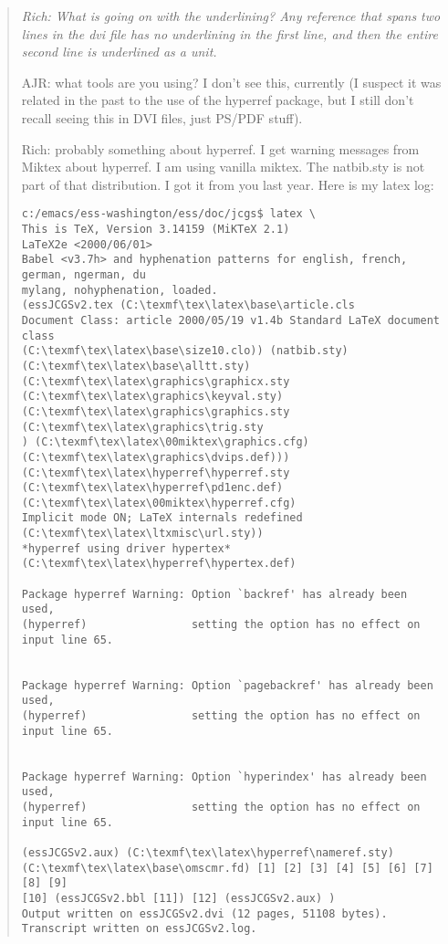 \documentclass{article}
\def\url#1{\textsf{#1}} %
\newenvironment{Comment}{\begin{quote}\small\itshape }{\end{quote}}
\begin{document}
\begin{Comment}
  Rich: What is going on with the underlining?  Any reference that spans
two lines in the dvi file has no underlining in the first line, and then the
entire second line is underlined as a unit.

AJR: what tools are you using?  I don't see this, currently (I suspect
it was related in the past to the use of the hyperref package, but I
still don't recall seeing this in DVI files, just PS/PDF stuff).

Rich: probably something about hyperref.  I get warning messages from
Miktex about hyperref.  I am using vanilla miktex.  The natbib.sty is
not part of that distribution.  I got it from you last year.  Here is
my latex log:
\begin{verbatim}
c:/emacs/ess-washington/ess/doc/jcgs$ latex \
This is TeX, Version 3.14159 (MiKTeX 2.1)
LaTeX2e <2000/06/01>
Babel <v3.7h> and hyphenation patterns for english, french, german, ngerman, du
mylang, nohyphenation, loaded.
(essJCGSv2.tex (C:\texmf\tex\latex\base\article.cls
Document Class: article 2000/05/19 v1.4b Standard LaTeX document class
(C:\texmf\tex\latex\base\size10.clo)) (natbib.sty)
(C:\texmf\tex\latex\base\alltt.sty) (C:\texmf\tex\latex\graphics\graphicx.sty
(C:\texmf\tex\latex\graphics\keyval.sty)
(C:\texmf\tex\latex\graphics\graphics.sty (C:\texmf\tex\latex\graphics\trig.sty
) (C:\texmf\tex\latex\00miktex\graphics.cfg)
(C:\texmf\tex\latex\graphics\dvips.def)))
(C:\texmf\tex\latex\hyperref\hyperref.sty
(C:\texmf\tex\latex\hyperref\pd1enc.def)
(C:\texmf\tex\latex\00miktex\hyperref.cfg)
Implicit mode ON; LaTeX internals redefined
(C:\texmf\tex\latex\ltxmisc\url.sty))
*hyperref using driver hypertex*
(C:\texmf\tex\latex\hyperref\hypertex.def)

Package hyperref Warning: Option `backref' has already been used,
(hyperref)                setting the option has no effect on input line 65.


Package hyperref Warning: Option `pagebackref' has already been used,
(hyperref)                setting the option has no effect on input line 65.


Package hyperref Warning: Option `hyperindex' has already been used,
(hyperref)                setting the option has no effect on input line 65.

(essJCGSv2.aux) (C:\texmf\tex\latex\hyperref\nameref.sty)
(C:\texmf\tex\latex\base\omscmr.fd) [1] [2] [3] [4] [5] [6] [7] [8] [9]
[10] (essJCGSv2.bbl [11]) [12] (essJCGSv2.aux) )
Output written on essJCGSv2.dvi (12 pages, 51108 bytes).
Transcript written on essJCGSv2.log.
\end{verbatim}

\end{Comment}
\end{document}
